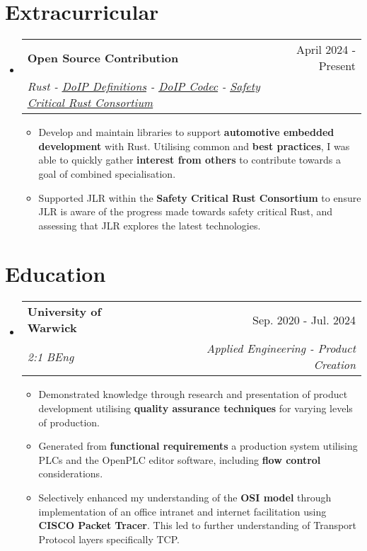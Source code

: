 \documentclass[letterpaper,11pt]{article}
\makeatletter
\newcommand{\resumeItem}[1]{
  \item\small{
    {#1 \vspace{-2pt}}
  }
}
\newcommand{\resumeSubheading}[4]{
  \vspace{-2pt}\item
    \begin{tabular*}{0.97\textwidth}[t]{l@{\extracolsep{\fill}}r}
      \textbf{#1} & #2 \\
      \textit{\small#3} & \textit{\small #4} \\
    \end{tabular*}\vspace{-7pt}
}
\newcommand{\resumeSubHeadingListStart}{\begin{itemize}[leftmargin=0.15in, label={}]}
\newcommand{\resumeSubHeadingListEnd}{\end{itemize}}
\newcommand{\resumeItemListStart}{\begin{itemize}}
\newcommand{\resumeItemListEnd}{\end{itemize}\vspace{-5pt}}
\makeatother
\begin{document}
\section{Extracurricular}
  \resumeSubHeadingListStart
    \resumeSubheading
      {Open Source Contribution}{April 2024 - Present}
      {Rust - \href{https://crates.io/crates/doip-definitions}{\underline{DoIP Definitions}} - \href{https://crates.io/crates/doip-codec}{\underline{DoIP Codec}} - \href{https://github.com/rustfoundation/safety-critical-rust-consortium}{\underline{Safety Critical Rust Consortium}}}{}
      \resumeItemListStart
      \resumeItem{Develop and maintain libraries to support \textbf{automotive embedded development} with Rust. Utilising common and \textbf{best practices}, I was able to quickly gather \textbf{interest from others} to contribute towards a goal of combined specialisation.}
      \resumeItem{Supported JLR within the \textbf{Safety Critical Rust Consortium} to ensure JLR is aware of the progress made towards safety critical Rust, and assessing that JLR explores the latest technologies.}
      \resumeItemListEnd
  \resumeSubHeadingListEnd
\section{Education}
  \resumeSubHeadingListStart
    \resumeSubheading
      {University of Warwick}{Sep. 2020 - Jul. 2024}
      {2:1 BEng}{Applied Engineering - Product Creation}
      \resumeItemListStart
      \resumeItem{Demonstrated knowledge through research and presentation of product development utilising \textbf{quality assurance techniques} for varying levels of production.}
      \resumeItem{Generated from \textbf{functional requirements} a production system utilising PLCs and the OpenPLC editor software, including \textbf{flow control} considerations.}
      \resumeItem{Selectively enhanced my understanding of the \textbf{OSI model} through implementation of an office intranet and internet facilitation using \textbf{CISCO Packet Tracer}. This led to further understanding of Transport Protocol layers specifically TCP.}
      \resumeItemListEnd
  \resumeSubHeadingListEnd
\end{document}
